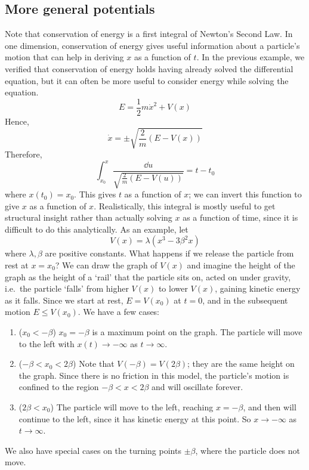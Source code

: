 \subsection{More general potentials}
Note that conservation of energy is a first integral of Newton's Second Law.
In one dimension, conservation of energy gives useful information about a particle's motion that can help in deriving \(x\) as a function of \(t\).
In the previous example, we verified that conservation of energy holds having already solved the differential equation, but it can often be more useful to consider energy while solving the equation.
\[
	E = \frac{1}{2}m\dot x^2 + V(x)
\]
Hence,
\[
	\dot x = \pm \sqrt{\frac{2}{m}(E - V(x))}
\]
Therefore,
\[
	\int_{x_0}^x \frac{\dd{u}}{\sqrt{\frac{2}{m}(E - V(u))}} = t - t_0
\]
where \(x(t_0) = x_0\).
This gives \(t\) as a function of \(x\); we can invert this function to give \(x\) as a function of \(x\).
Realistically, this integral is mostly useful to get structural insight rather than actually solving \(x\) as a function of time, since it is difficult to do this analytically.
As an example, let
\[
	V(x) = \lambda(x^3 - 3 \beta^2 x)
\]
where \(\lambda, \beta\) are positive constants.
What happens if we release the particle from rest at \(x=x_0\)?
We can draw the graph of \(V(x)\) and imagine the height of the graph as the height of a `rail' that the particle sits on, acted on under gravity, i.e.\ the particle `falls' from higher \(V(x)\) to lower \(V(x)\), gaining kinetic energy as it falls.
Since we start at rest, \(E = V(x_0)\) at \(t=0\), and in the subsequent motion \(E \leq V(x_0)\).
We have a few cases:
\begin{enumerate}
	\item (\(x_0 < -\beta\)) \(x_0 = -\beta\) is a maximum point on the graph.
	      The particle will move to the left with \(x(t) \to -\infty\) as \(t \to \infty\).
	\item (\(-\beta < x_0 < 2\beta\)) Note that \(V(-\beta) = V(2\beta)\); they are the same height on the graph.
	      Since there is no friction in this model, the particle's motion is confined to the region \(-\beta < x < 2\beta\) and will oscillate forever.
	\item (\(2\beta < x_0\)) The particle will move to the left, reaching \(x=-\beta\), and then will continue to the left, since it has kinetic energy at this point.
	      So \(x \to -\infty\) as \(t \to \infty\).
\end{enumerate}
We also have special cases on the turning points \(\pm\beta\), where the particle does not move.
